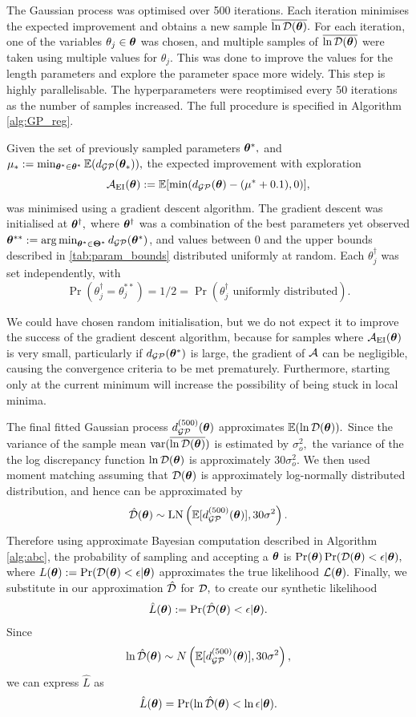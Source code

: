 The Gaussian process was optimised over 500 iterations. Each iteration 
minimises the expected improvement and obtains a new sample $\overline{\ln\mathcal{D}(\bm{\theta})}.$
For each iteration, one of the variables $\theta_j \in \bm{\theta}$ was chosen, and
multiple samples of $\overline{\ln\mathcal{D}(\bm{\theta})}$ were taken using multiple values for $\theta_j.$
This was done to improve the values for the length parameters and
explore the parameter space more widely. This step is highly
parallelisable.
The hyperparameters were
reoptimised every 50 iterations as the number of samples increased. The full
procedure is specified in Algorithm \ref{alg:GP_reg}.

Given the set of previously sampled parameters $\bm{\theta}^\ast,$ and
$\mu_* := \min_{\bm{\theta}^\ast\in\bm{\theta}^\ast}\operatorname{\mathbb{E}}(d_{\mathcal{GP}}(\bm{\theta}_\ast)),$
the expected improvement with exploration
$$
    \mathcal{A}_{\mathrm{EI}}(\bm{\theta})
    := \operatorname{\mathbb{E}}[\min(d_{\mathcal{GP}}(\bm{\theta}) - (\mu^\ast + 0.1), 0)],
$$
was minimised using a gradient descent algorithm. The gradient descent was
initialised at $\bm{\theta}^\dagger,$ where $\bm{\theta}^\dagger$ was a
combination of the best parameters yet observed
$\bm{\theta}^{**} := \operatorname*{arg\,min}_{\bm{\theta}^\ast\in\bm{\Theta}^\ast} d_{\mathcal{GP}}(\bm{\theta}^\ast)$,
and values between 0 and the upper bounds described in \ref{tab:param_bounds}
distributed uniformly at random. Each $\theta_j^\dagger$ was set independently,
with
$$
    \Pr(\theta_j^\dagger = \theta_j^{**})
    = 1/2
    = \Pr(\theta_j^\dagger \text{ uniformly distributed}).
$$

We could have chosen random initialisation, but we do not expect it to improve
the success of the gradient descent algorithm, because for samples where
$\mathcal{A}_{\mathrm{EI}}(\bm{\theta})$ is very small, particularly if
$d_{\mathcal{GP}}(\bm{\theta}^\ast)$ is
large, the gradient of $\mathcal{A}$ can be negligible, causing the convergence criteria
to be met prematurely.
Furthermore, starting only at the current minimum will
increase the possibility of being stuck in local minima.

The final fitted Gaussian process
$d_{\mathcal{GP}}^{(500)}(\bm{\theta})$ approximates $\operatorname{\mathbb{E}}(\ln\mathcal{D}(\bm{\theta})).$ Since the
variance of the sample mean $\operatorname{var}(\overline{\ln\mathcal{D}(\bm{\theta})})$ is estimated by $\sigma_o^2,$ the
variance of the the log discrepancy function $\ln\mathcal{D}(\bm{\theta})$ is
approximately $30\sigma_o^2.$ We then used moment matching assuming that
$\mathcal{D}(\bm{\theta})$ is approximately log-normally distributed
distribution, and hence can be approximated by
$$
    \hat{\mathcal{D}}(\bm{\theta}) \sim
    \operatorname{LN}\left(\operatorname{\mathbb{E}}[d_{\mathcal{GP}}^{(500)}(\bm{\theta})], 30 \sigma^2\right).
$$
Therefore using approximate Bayesian computation described in
Algorithm \ref{alg:abc}, the probability of sampling
and accepting a $\bm{\theta}$ is
$\Pr(\bm{\theta})\Pr(\mathcal{D}(\bm{\theta}) < \epsilon | \bm{\theta}),$ where
$L(\bm{\theta}):=\Pr(\mathcal{D}(\bm{\theta}) < \epsilon | \bm{\theta})$ approximates the true
likelihood $\operatorname{\mathcal{L}}(\bm{\theta}).$
Finally, we substitute in our approximation $\hat{\mathcal{D}}$ for $\mathcal{D},$ to create our
synthetic likelihood
\begin{align}
    \hat{L}(\bm{\theta}) := \Pr(\hat{\mathcal{D}}(\bm{\theta}) < \epsilon | \bm{\theta}).
    \label{eq:fin_lik}
\end{align}
Since
$$
    \ln\hat{\mathcal{D}}(\bm{\theta})
    \sim N\left(\operatorname{\mathbb{E}}[d_{\mathcal{GP}}^{(500)}(\bm{\theta})], 30 \sigma^2\right),
$$
we can express $\hat{L}$ as
$$
    \hat{L}(\bm{\theta}) =\Pr(\ln\hat{\mathcal{D}}(\bm{\theta}) < \ln\epsilon | \bm{\theta}).
$$

